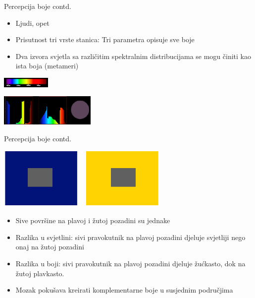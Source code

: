 \documentclass[9pt]{beamer}
\begin{document}
\begin{frame}{Percepcija boje contd.}
	\begin{itemize}
		\item Ljudi, opet
		\item Prisutnost tri vrste stanica: Tri parametra opisuje sve boje
		\item Dva izvora svjetla sa različitim spektralnim distribucijama se mogu činiti kao ista boja (metameri)
	\end{itemize}
	\begin{center}
		\includegraphics[height=0.5cm]{slike/02_vidljivi_spektar2.png}
	\end{center}
	\begin{center}
		\includegraphics[height=1.5cm]{slike/02_vidljivi_spektar3.png}
	\end{center}
\end{frame}

\begin{frame}{Percepcija boje contd.}
	\begin{center}
		\includegraphics[height=3cm]{slike/color_contrast.png}
	\end{center}
	\begin{itemize}
		\item Sive površine na plavoj i žutoj pozadini su jednake
		\item Razlika u svjetlini: sivi pravokutnik na plavoj pozadini djeluje svjetliji nego onaj na žutoj pozadini
		\item Razlika u boji: sivi pravokutnik na plavoj pozadini djeluje  žućkasto, dok na žutoj plavkasto. 
		\item Mozak pokušava kreirati komplementarne boje u susjednim područjima
	\end{itemize}
\end{frame}
\end{document}
